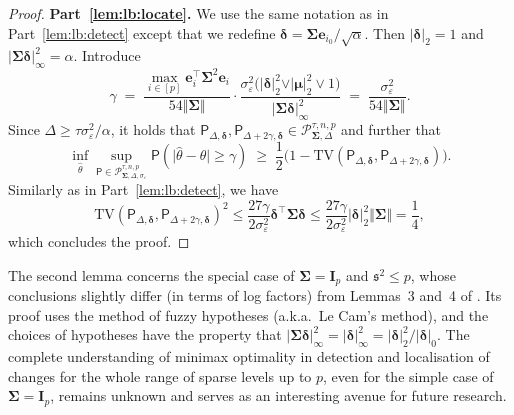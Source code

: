 \documentclass[11pt, a4paper]{article}
\newcommand{\mbf}{\mathbf}
\newcommand{\mc}{\mathcal}
\newcommand{\vep}{\varepsilon}
\renewcommand{\l}{\left}
\renewcommand{\r}{\right}
\def\wh{\widehat}
\newcommand{\p}{\mathsf{P}}
\theoremstyle{definition}
\theoremstyle{definition}
\theoremstyle{definition}
\theoremstyle{definition}
\theoremstyle{definition}
\theoremstyle{remark}
\theoremstyle{definition}
\theoremstyle{definition}
\theoremstyle{definition}
\begin{document}
\begin{proof}
{\bf Part~\ref{lem:lb:locate}.} We use the same notation as in Part~\ref{lem:lb:detect} except that we redefine $\bm \delta = \bm\Sigma \bm e_{i_0}/\sqrt{\alpha}$. Then $\vert\bm \delta\vert_2 = 1$ and $\vert\bm \Sigma \bm\delta\vert_{\infty}^2 = \alpha$.
Introduce 
\[
\gamma \;=\;\frac{\max_{i \in [p]}\bm e_i^\top \bm\Sigma^2 \bm e_i}{54\Vert\bm\Sigma\Vert}\cdot \frac{\sigma_{\vep}^2\bigl(\vert\bm\delta\vert_2^2 \vee \vert \bm\mu\vert_2^2  \vee 1\bigr)}{\vert\bm\Sigma\bm\delta\vert_{\infty}^2} \;=\; \frac{\sigma^2_{\vep}}{54\Vert\bm\Sigma\Vert}.
\]
Since $\Delta \ge \tau \sigma_{\vep}^2/\alpha$, it holds that $\p_{\Delta, \bm\delta}, \p_{\Delta + 2\gamma, \bm\delta} \in \mc P^{\tau, n, p}_{\bm\Sigma, \Delta}$ and further that
$$
\inf_{\wh\theta} \sup_{\p \in \mc P_{\bm\Sigma, \Delta, \sigma_{\vep}}^{\tau, n, p}} \p\l(\bigl\vert\wh\theta -\theta\bigr\vert \ge \gamma\r) \;\ge\; \frac{1}{2}\bigl(1 - \mathrm{TV}(\p_{\Delta,\bm\delta},\p_{\Delta+2\gamma, \bm\delta})\bigr).
$$
Similarly as in Part~\ref{lem:lb:detect}, we have 
\[
\mathrm{TV}(\p_{\Delta,\bm\delta},\p_{\Delta + 2\gamma, \bm\delta})^2 \le \frac{27\gamma}{2\sigma^2_{\vep}}\bm\delta^\top\bm\Sigma\bm\delta  \le \frac{27\gamma}{2\sigma^2_{\vep}}\vert\bm\delta\vert_2^2\Vert\bm\Sigma\Vert = \frac{1}{4},
\]
which concludes the proof. 
\end{proof}

The second lemma concerns the special case of $\bm\Sigma = \mbf I_p$ and $\mathfrak{s}^2\le p$, whose conclusions slightly differ (in terms of log factors) from Lemmas~3 and~4 of \citet{rinaldo2020localizing}. Its proof uses the method of fuzzy hypotheses (a.k.a.\ Le Cam’s method), and the choices of hypotheses have the property that \(\vert\bm \Sigma\bm\delta\vert_{\infty}^2 = \vert\bm\delta\vert_{\infty}^2 = \vert\bm\delta\vert_2^2 / {\vert\bm\delta\vert_0}\).
The complete understanding of minimax optimality in detection and localisation of changes for the whole range of sparse levels up to $p$, even for the simple case of $\bm\Sigma = \mbf I_p$, remains unknown and serves as an interesting avenue for future research.
\end{document}

